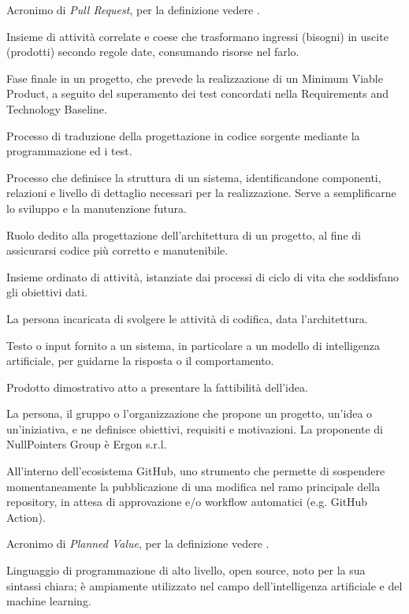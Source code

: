 Acronimo di \textit{Pull Request}, per la definizione vedere .

Insieme di attività correlate e coese che trasformano ingressi (bisogni) in uscite (prodotti) secondo regole date, consumando risorse nel farlo.

Fase finale in un progetto, che prevede la realizzazione di un Minimum Viable Product, a seguito del superamento dei test concordati nella Requirements and Technology Baseline.

Processo di traduzione della progettazione in codice sorgente mediante la programmazione ed i test.

Processo che definisce la struttura di un sistema, identificandone componenti, relazioni e livello di dettaglio necessari per la realizzazione. Serve a semplificarne lo sviluppo e la manutenzione futura.

Ruolo dedito alla progettazione dell'architettura di un progetto, al fine di assicurarsi codice più corretto e manutenibile.

Insieme ordinato di attività, istanziate dai processi di ciclo di vita che soddisfano gli obiettivi dati.

La persona incaricata di svolgere le attività di codifica, data l'architettura.

Testo o input fornito a un sistema, in particolare a un modello di intelligenza artificiale, per guidarne la risposta o il comportamento.

Prodotto dimostrativo atto a presentare la fattibilità dell'idea.

La persona, il gruppo o l’organizzazione che propone un progetto, un’idea o un’iniziativa, e ne definisce obiettivi, requisiti e motivazioni. La proponente di NullPointers Group è Ergon s.r.l.

All'interno dell'ecosistema GitHub, uno strumento che permette di sospendere momentaneamente la pubblicazione di una modifica nel ramo principale della repository, in attesa di approvazione e/o workflow automatici (e.g. GitHub Action).

Acronimo di \textit{Planned Value}, per la definizione vedere .

Linguaggio di programmazione di alto livello, open source, noto per la sua sintassi chiara; è ampiamente utilizzato nel campo dell'intelligenza artificiale e del machine learning.

